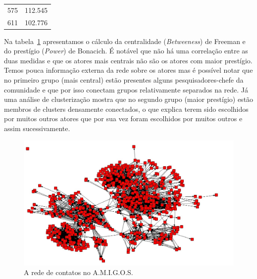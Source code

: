 \documentclass{article}
\begin{document}
\begin{table}[htbp]
\begin{boxedminipage}{\textwidth}
\begin{tabular}{| l | c |}
			575 & 112.545 \\
			611 & 102.776 \\
			\hline
		\end{tabular}
		\label{tab:acontccent}
\flushleft
\normalsize
Na tabela~\ref{tab:acontccent} apresentamos o cálculo da centralidade
(\textit{Betweeness}) de Freeman e do prestígio (\textit{Power}) de Bonacich.
É notável que não há uma correlação entre as duas medidas e que os atores mais
centrais não são os atores com maior prestígio. Temos pouca informação externa
da rede sobre os atores mas é possível notar que no primeiro grupo (mais
central) estão presentes alguns pesquisadores-chefe da comunidade e que por isso
conectam grupos relativamente separados na rede. Já uma análise de clusterização
mostra que no segundo grupo (maior prestígio) estão membros de clusters
densamente conectados, o que explica terem sido escolhidos por muitos outros
atores que por sua vez foram escolhidos por muitos outros e assim
sucessivamente.

	\end{boxedminipage}
\end{table}
\clearpage
\begin{figure}[h!]
  \caption{A rede de contatos no A.M.I.G.O.S.}
  \centering
    \includegraphics[width=\textwidth]{imgs/amigos-contatos.jpg}
\end{figure}




\end{document}

